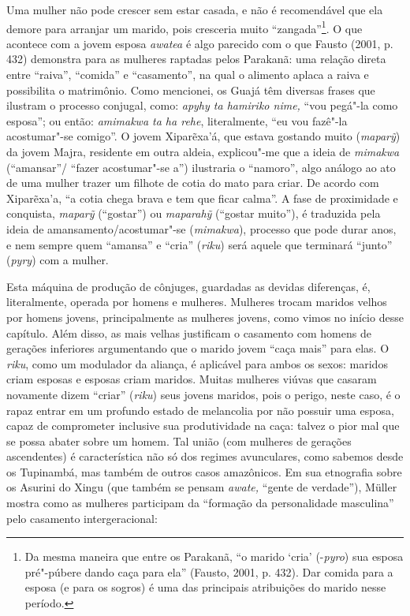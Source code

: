 Uma mulher não pode crescer sem estar casada, e não é recomendável que
ela demore para arranjar um marido, pois cresceria muito
``zangada''\footnote{Da mesma maneira que entre os Parakanã, ``o marido
  `cria' (-\emph{pyro}) sua esposa pré"-púbere dando caça para ela''
  (Fausto, 2001, p. 432). Dar comida para a esposa (e para os sogros) é uma
  das principais atribuições do marido nesse período.}. O que acontece
com a jovem esposa \emph{awatea} é algo parecido com o que Fausto
(2001, p. 432) demonstra para as mulheres raptadas pelos Parakanã: uma
relação direta entre ``raiva'', ``comida'' e ``casamento'', na qual o
alimento aplaca a raiva e possibilita o matrimônio. Como mencionei, os
Guajá têm diversas frases que ilustram o processo conjugal, como:
\emph{apyhy ta hamiriko nime,} ``vou pegá"-la como esposa''; ou então:
\emph{amimakwa ta ha rehe}, literalmente, ``eu vou fazê"-la acostumar"-se
comigo''. O jovem Xiparẽxa'á, que estava gostando muito (\emph{maparỹ})
da jovem Majra, residente em outra aldeia, explicou"-me que a ideia de
\emph{mimakwa} (``amansar''/ ``fazer acostumar"-se a'') ilustraria o
``namoro'', algo análogo ao ato de uma mulher trazer um filhote de cotia
do mato para criar. De acordo com Xiparẽxa'a, ``a cotia chega brava e tem
que ficar calma''. A fase de proximidade e conquista, \emph{maparỹ}
(``gostar'') ou \emph{maparahỹ} (``gostar muito''), é traduzida pela ideia
de amansamento/acostumar"-se (\emph{mimakwa}), processo que pode durar
anos, e nem sempre quem ``amansa'' e ``cria'' (\emph{riku}) será aquele que
terminará ``junto'' (\emph{pyry}) com a mulher.

Esta máquina de produção de cônjuges, guardadas as devidas diferenças,
é, literalmente, operada por homens e mulheres. Mulheres trocam maridos
velhos por homens jovens, principalmente as mulheres jovens, como vimos
no início desse capítulo. Além disso, as mais velhas justificam o
casamento com homens de gerações inferiores argumentando que o marido
jovem ``caça mais'' para elas. O \emph{riku}, como um modulador da
aliança, é aplicável para ambos os sexos: maridos criam esposas e
esposas criam maridos. Muitas mulheres viúvas que casaram novamente
dizem ``criar'' (\emph{riku}) seus jovens maridos, pois o perigo, neste
caso, é o rapaz entrar em um profundo estado de melancolia por não
possuir uma esposa, capaz de comprometer inclusive sua produtividade na
caça: talvez o pior mal que se possa abater sobre um homem. Tal união
(com mulheres de gerações ascendentes) é característica não só dos
regimes avunculares, como sabemos desde os Tupinambá, mas também de
outros casos amazônicos. Em sua etnografia sobre os Asurini do Xingu
(que também se pensam \emph{awate,} ``gente de verdade''), Müller mostra
como as mulheres participam da ``formação da personalidade masculina''
pelo casamento intergeracional:

